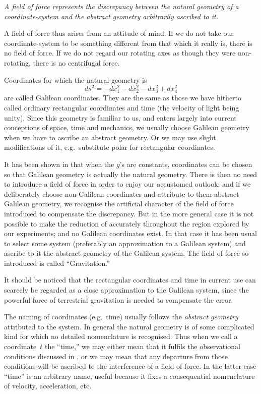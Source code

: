 \documentclass[12pt]{book}
\begin{document}
\emph{A field of force represents the discrepancy between the natural geometry of
a coordinate-system and the abstract geometry arbitrarily ascribed to it.}

A field of force thus arises from an attitude of mind. If we do not take
our coordinate-system to be something different from that which it really is,
there is no field of force. If we do not regard our rotating axes as though
they were non-rotating, there is no centrifugal force.

Coordinates for which the natural geometry is
\[
ds^{2} = - dx_{1}^{2} - dx_{2}^{2} - dx_{3}^{2} + dx_{4}^{2}
\]
are called Galilean coordinates. They are the same as those we have hitherto
%
%
called ordinary rectangular coordinates and time (the velocity of light being
unity). Since this geometry is familiar to us, and enters largely into current
conceptions of space, time and mechanics, we usually choose Galilean geometry
when we have to ascribe an abstract geometry. Or we may use slight modifications
of it, e.g.\ substitute polar for rectangular coordinates.

It has been shown in  that when the $g$'s are constants, coordinates can
be chosen so that Galilean geometry is actually the natural geometry. There
is then no need to introduce a field of force in order to enjoy our accustomed
outlook; and if we deliberately choose non-Galilean coordinates and attribute
to them abstract Galilean geometry, we recognise the artificial character of
the field of force introduced to compensate the discrepancy. But in the more
general case it is not possible to make the reduction of  accurately throughout
the region explored by our experiments; and no Galilean coordinates
exist. In that case it has been usual to select some system (preferably an
approximation to a Galilean system) and ascribe to it the abstract geometry
of the Galilean system. The field of force so introduced is called ``Gravitation.''
%

It should be noticed that the rectangular coordinates and time in current
%
use can scarcely be regarded as a close approximation to the Galilean system,
since the powerful force of terrestrial gravitation is needed to compensate
the error.

The naming of coordinates (e.g.\ time) usually follows the \emph{abstract geometry}
attributed to the system. In general the natural geometry is of some complicated
kind for which no detailed nomenclature is recognised. Thus when we
call a coordinate~$t$ the ``time,'' we may either mean that it fulfils the
observational conditions discussed in , or we may mean that any departure
from those conditions will be ascribed to the interference of a field of force.
In the latter case ``time'' is an arbitrary name, useful because it fixes a
consequential nomenclature of velocity, acceleration, etc.
\end{document}
